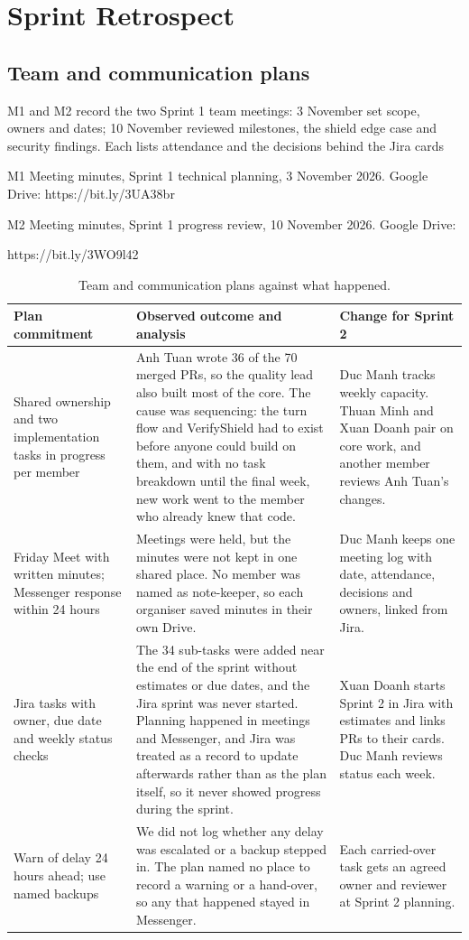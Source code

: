\documentclass[11pt,a4paper]{article}
\begin{document}
\section{Sprint Retrospect}
\subsection{Team and communication plans}
M1 and M2 record the two Sprint 1 team meetings: 3 November set scope, owners and dates; 10 November reviewed milestones, the shield edge case and security findings. Each lists attendance and the decisions behind the Jira cards

M1 Meeting minutes, Sprint 1 technical planning, 3 November 2026. Google Drive: https://bit.ly/3UA38br

M2 Meeting minutes, Sprint 1 progress review, 10 November 2026. Google Drive:

https://bit.ly/3WO9l42

{\small
\begin{longtable}{>{\raggedright\arraybackslash}p{}>{\raggedright\arraybackslash}p{}>{\raggedright\arraybackslash}p{}}
\caption{Team and communication plans against what happened.}\\
\toprule
\textbf{Plan commitment} & \textbf{Observed outcome and analysis} & \textbf{Change for Sprint 2} \\
\midrule
\endhead
Shared ownership and two implementation tasks in progress per member & Anh Tuan wrote 36 of the 70 merged PRs, so the quality lead also built most of the core. The cause was sequencing: the turn flow and VerifyShield had to exist before anyone could build on them, and with no task breakdown until the final week, new work went to the member who already knew that code. & Duc Manh tracks weekly capacity. Thuan Minh and Xuan Doanh pair on core work, and another member reviews Anh Tuan's changes. \\
Friday Meet with written minutes; Messenger response within 24 hours & Meetings were held, but the minutes were not kept in one shared place. No member was named as note-keeper, so each organiser saved minutes in their own Drive. & Duc Manh keeps one meeting log with date, attendance, decisions and owners, linked from Jira. \\
Jira tasks with owner, due date and weekly status checks & The 34 sub-tasks were added near the end of the sprint without estimates or due dates, and the Jira sprint was never started. Planning happened in meetings and Messenger, and Jira was treated as a record to update afterwards rather than as the plan itself, so it never showed progress during the sprint. & Xuan Doanh starts Sprint 2 in Jira with estimates and links PRs to their cards. Duc Manh reviews status each week. \\
Warn of delay 24 hours ahead; use named backups & We did not log whether any delay was escalated or a backup stepped in. The plan named no place to record a warning or a hand-over, so any that happened stayed in Messenger. & Each carried-over task gets an agreed owner and reviewer at Sprint 2 planning. \\
\bottomrule
\end{longtable}}
\end{document}
